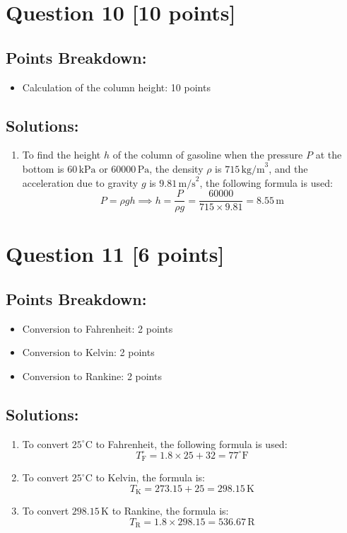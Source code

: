 \documentclass[12pt]{article}
\begin{document}
\newpage
\section*{Question 10 [10 points]}
\subsection*{Points Breakdown:}
\begin{itemize}
    \item Calculation of the column height: 10 points
\end{itemize}

\subsection*{Solutions:}
\begin{enumerate}
    \item To find the height \( h \) of the column of gasoline when the pressure \( P \) at the bottom is \( 60 \, \text{kPa} \) or \( 60000 \, \text{Pa} \), the density \( \rho \) is \( 715 \, \text{kg/m}^3 \), and the acceleration due to gravity \( g \) is \( 9.81 \, \text{m/s}^2 \), the following formula is used:
    \[
    P = \rho gh \implies h = \frac{P}{\rho g} = \frac{60000}{715 \times 9.81} = 8.55 \, \text{m}
    \]
\end{enumerate}

\newpage
\section*{Question 11 [6 points]}
\subsection*{Points Breakdown:}
\begin{itemize}
    \item Conversion to Fahrenheit: 2 points
    \item Conversion to Kelvin: 2 points
    \item Conversion to Rankine: 2 points
\end{itemize}

\subsection*{Solutions:}
\begin{enumerate}
    \item To convert \( 25^\circ\text{C} \) to Fahrenheit, the following formula is used:
    \[
    T_{\text{F}}^\circ = 1.8 \times 25 + 32 = 77^\circ\text{F}
    \]
    
    \item To convert \( 25^\circ\text{C} \) to Kelvin, the formula is:
    \[
    T_{\text{K}} = 273.15 + 25 = 298.15 \, \text{K}
    \]

    \item To convert \( 298.15 \, \text{K} \) to Rankine, the formula is:
    \[
    T_{\text{R}} = 1.8 \times 298.15 = 536.67 \, \text{R}
    \]
\end{enumerate}
\end{document}
